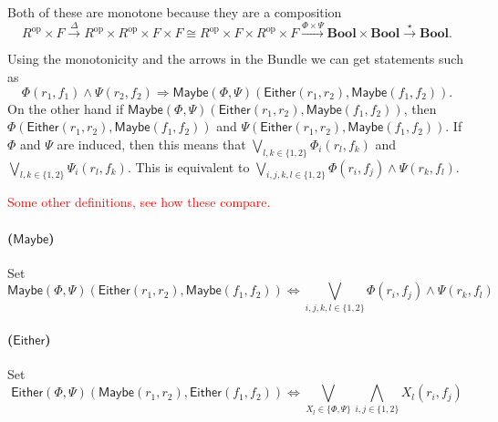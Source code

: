 \documentclass[12pt]{article}
\theoremstyle{definition}
\theoremstyle{plain}
\theoremstyle{plain}
\theoremstyle{plain}
\theoremstyle{plain}
\theoremstyle{remark}
\theoremstyle{remark}
\newcommand{\maybe}{\mathsf{Maybe}}
\newcommand{\either}{\mathsf{Either}}
\begin{document}
Both of these are monotone because they are a composition
$$
R^\text{op} \times F \stackrel{\Delta}{\rightarrow} R^\text{op} \times R^\text{op} \times F \times F \cong R^\text{op} \times F \times R^\text{op} \times F \stackrel{\Phi \times \Psi}{\rightarrow} \mathbf{Bool} \times \mathbf{Bool} \stackrel{\star}{\rightarrow} \mathbf{Bool}.
$$

Using the monotonicity and the arrows in the Bundle we can get statements such as
$$\Phi(r_1,f_1) \wedge \Psi(r_2,f_2) \Rightarrow \maybe(\Phi,\Psi)(\either(r_1,r_2),\maybe(f_1,f_2)) .$$
On the other hand if $\maybe(\Phi,\Psi)(\either(r_1,r_2),\maybe(f_1,f_2))$, then $\Phi(\either(r_1,r_2), \maybe(f_1,f_2))$ and $\Psi(\either(r_1,r_2), \maybe(f_1,f_2))$. If $\Phi$ and $\Psi$ are induced, then this means that $\bigvee_{l,k \in \{1,2\}}\Phi_i(r_l,f_k)$ and $\bigvee_{l,k \in \{1,2\}}\Psi_i(r_l,f_k)$. This is equivalent to  $\bigvee_{i,j,k,l \in \{1,2\}}\Phi(r_i,f_j) \wedge \Psi(r_k,f_l)$.

\textcolor{red}{Some other definitions, see how these compare.}
\paragraph{($\maybe$)} Set
$$\maybe(\Phi,\Psi)(\either(r_1,r_2), \maybe(f_1,f_2))  \Leftrightarrow \bigvee_{i,j,k,l \in \{1,2\}}\Phi(r_i,f_j) \wedge \Psi(r_k,f_l)$$


\paragraph{($\either$)} Set
$$\either(\Phi,\Psi)(\maybe(r_1,r_2), \either(f_1,f_2))  \Leftrightarrow \bigvee_{X_l \in \{\Phi,\Psi\}} \bigwedge_{i,j \in \{1,2\}}X_l(r_i,f_j)$$

\end{document}
